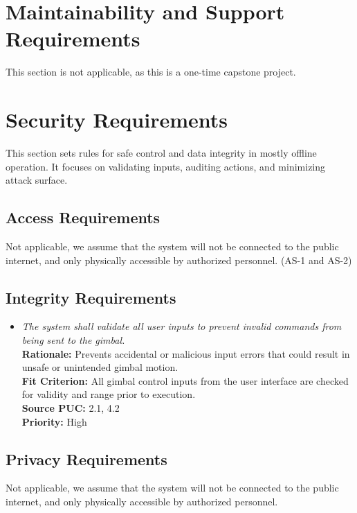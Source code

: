 \documentclass[12pt]{article}
\begin{document}
\section{Maintainability and Support Requirements}

This section is not applicable, as this is a one-time capstone project.

\section{Security Requirements}
This section sets rules for safe control and data integrity in mostly offline
operation. It focuses on validating inputs, auditing actions, and minimizing
attack surface.
\subsection{Access Requirements}

Not applicable, we assume that the system will not be connected to the public
internet, and only physically accessible by authorized personnel. (AS-1 and
AS-2)

\subsection{Integrity Requirements}
\begin{itemize}[leftmargin=*]
  \item[IR-1] \emph{The system shall validate all user inputs to prevent invalid
          commands from being sent to the gimbal.}\\[2mm]
        \textbf{Rationale:} Prevents accidental or malicious input errors that could result in unsafe or unintended gimbal motion.\\
        \textbf{Fit Criterion:} All gimbal control inputs from the user interface are checked for validity and range prior to execution.\\
        \textbf{Source PUC:} 2.1, 4.2 \\
        \textbf{Priority:} High
\end{itemize}

\subsection{Privacy Requirements}

Not applicable, we assume that the system will not be connected to the public
internet, and only physically accessible by authorized personnel.
\end{document}
